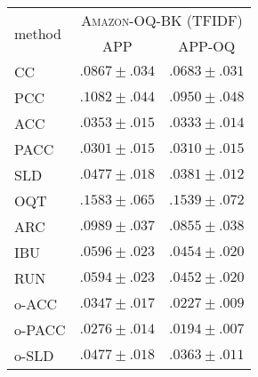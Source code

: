\begin{tabular}{lcc}
  \toprule
  \multirow{2}{*}{method} & \multicolumn{2}{c}{\textsc{Amazon-OQ-BK} (TFIDF)} \\
  & APP & APP-OQ \\
  \midrule
  CC & ${.0867 \pm .034}$ & ${.0683 \pm .031}$ \\
  PCC & ${.1082 \pm .044}$ & ${.0950 \pm .048}$ \\
  ACC & ${.0353 \pm .015}$ & ${.0333 \pm .014}$ \\
  PACC & ${.0301 \pm .015}$ & ${.0310 \pm .015}$ \\
  SLD & ${.0477 \pm .018}$ & ${.0381 \pm .012}$ \\[.5em]
  OQT & ${.1583 \pm .065}$ & ${.1539 \pm .072}$ \\
  ARC & ${.0989 \pm .037}$ & ${.0855 \pm .038}$ \\
  IBU & ${.0596 \pm .023}$ & ${.0454 \pm .020}$ \\
  RUN & ${.0594 \pm .023}$ & ${.0452 \pm .020}$ \\[.5em]
  o-ACC & ${.0347 \pm .017}$ & ${.0227 \pm .009}$ \\
  o-PACC & $\mathbf{.0276 \pm .014}$ & $\mathbf{.0194 \pm .007}$ \\
  o-SLD & ${.0477 \pm .018}$ & ${.0363 \pm .011}$ \\
  \bottomrule
\end{tabular}
